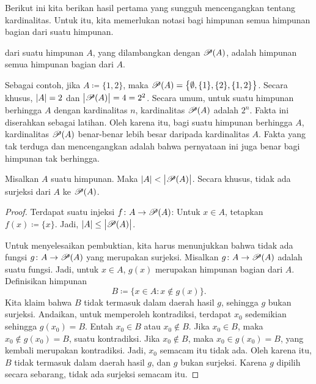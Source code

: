 \pagebreak[2]
Berikut ini kita berikan hasil pertama yang sungguh mencengangkan tentang kardinalitas.
Untuk itu, kita memerlukan notasi bagi
himpunan semua himpunan bagian dari suatu himpunan.

\begin{defn}
\emph{} dari suatu himpunan $A$, yang dilambangkan dengan ${\mathscr{P}}(A)$,
 adalah himpunan semua himpunan bagian dari $A$.
\end{defn}

Sebagai contoh, jika $A \coloneqq \{ 1,2\}$,
maka ${\mathscr{P}}(A) = \bigl\{ \emptyset, \{ 1 \}, \{ 2 \}, \{ 1, 2 \} \bigr\}$.
Secara khusus, $\lvert {A} \rvert = 2$ dan $\bigl\lvert {{\mathscr{P}}(A)} \bigr\rvert = 4 = 2^2$.
Secara umum,
untuk suatu himpunan berhingga $A$ dengan kardinalitas $n$,
kardinalitas ${\mathscr{P}}(A)$ adalah $2^n$.
Fakta ini diserahkan sebagai latihan.  
Oleh karena itu, bagi suatu himpunan berhingga $A$,
kardinalitas ${\mathscr{P}}(A)$ benar-benar
lebih besar daripada
kardinalitas $A$.  Fakta yang tak terduga dan
mencengangkan adalah bahwa pernyataan ini juga benar bagi himpunan tak berhingga.

\begin{thm}
\label{cantorspowersetthm}
Misalkan $A$ suatu himpunan.  Maka
$\lvert {A} \rvert < \bigl\lvert {{\mathscr{P}}(A)} \bigr\rvert$.
Secara khusus, tidak ada surjeksi dari
$A$ ke ${\mathscr{P}}(A)$.
\end{thm}

\begin{proof}
Terdapat suatu injeksi $f \colon A \to {\mathscr{P}}(A)$:
Untuk $x \in A$, tetapkan $f(x) \coloneqq \{ x \}$.  Jadi,
$\lvert {A} \rvert \leq \bigl\lvert {{\mathscr{P}}(A)} \bigr\rvert$.

Untuk menyelesaikan pembuktian, kita harus menunjukkan bahwa
tidak ada fungsi $g \colon A \to {\mathscr{P}}(A)$ yang merupakan surjeksi.
Misalkan 
$g \colon A \to {\mathscr{P}}(A)$ adalah suatu fungsi.  Jadi, untuk $x \in A$,
$g(x)$ merupakan himpunan bagian dari $A$.  Definisikan himpunan
\begin{equation*}
B \coloneqq \bigl\{ x \in A : x \notin g(x) \bigr\} .
\end{equation*}
Kita klaim bahwa $B$ tidak termasuk dalam daerah hasil $g$, sehingga $g$ bukan
surjeksi.  Andaikan, untuk memperoleh kontradiksi, terdapat $x_0$ sedemikian sehingga $g(x_0) = B$.
Entah $x_0 \in B$ atau $x_0 \notin B$.  Jika $x_0 \in B$, maka $x_0 \notin
g(x_0) = B$, suatu kontradiksi.  Jika $x_0 \notin B$, maka $x_0 \in
g(x_0) = B$, yang kembali merupakan kontradiksi.  Jadi, $x_0$ semacam itu tidak
ada.  Oleh karena itu, $B$ tidak termasuk dalam daerah hasil $g$, dan $g$ bukan
surjeksi.  Karena $g$ dipilih secara sebarang, tidak ada surjeksi semacam itu.
\end{proof}

